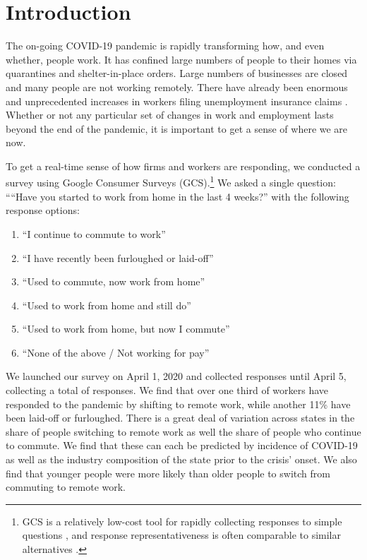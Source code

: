 \documentclass[12pt]{article}
\newcommand{\covid}{COVID-19}
\begin{document}
\onehalfspacing 

\section{Introduction}
The on-going \covid{} pandemic is rapidly transforming how, and even whether, people work. It has confined large numbers of people to their homes via quarantines and shelter-in-place orders. Large numbers of businesses are closed and many people are not working remotely. There have already been enormous and unprecedented increases in workers filing unemployment insurance claims \citep{goldsmith2020}. Whether or not any particular set of changes in work and employment lasts beyond the end of the pandemic, it is important to get a sense of where we are now.

To get a real-time sense of how firms and workers are responding, we conducted a survey using Google Consumer Surveys (GCS).\footnote{
GCS is a relatively low-cost tool for rapidly collecting responses to simple questions \cite{stephens2014hands}, and response representativeness is often comparable to similar alternatives \citep{santoso2016survey, brynjolfsson2019using}.}  We asked a single question:
````Have you started to work from home in the last 4 weeks?''
with the following response options: 
\begin{enumerate} 
\item ``I continue to commute to work''
\item ``I have recently been furloughed or laid-off''
\item ``Used to commute, now work from home''   
\item ``Used to work from home and still do''       
\item ``Used to work from home, but now I commute''
\item ``None of the above / Not working for pay''
\end{enumerate} 


We launched our survey on April 1, 2020 and collected responses until April 5, collecting a total of \numObs{} responses.
We find that over one third of workers have responded to the pandemic by shifting to remote work, while another 11\% have been laid-off or furloughed.
There is a great deal of variation across states in the share of people switching to remote work as well the share of people who continue to commute. We find that these can each be predicted by incidence of COVID-19 as well as the industry composition of the state prior to the crisis' onset.  We also find that younger people were more likely than older people to switch from commuting to remote work.
\end{document}
